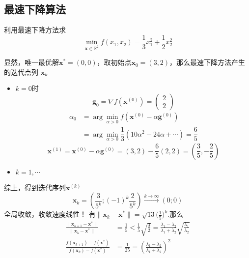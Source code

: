 \subsection{最速下降算法}
\begin{example}
    利用最速下降方法求
    \[
        \min\limits_{\boldsymbol{x}\in\mathbb{R}^2}f(x_1,x_2) = \dfrac{1}{3}x_{1}^2+\dfrac{1}{2}x_2^2
    \]
    \begin{solution}
        显然，唯一最优解$\boldsymbol{x}^* = \left( 0,0 \right)$，取初始点$\boldsymbol{x}_0 = (3,2)$，那么最速下降方法产生的迭代点列
        $\boldsymbol{x}_k$

        \begin{itemize}
            \item $k = 0$时
            \[
                \boldsymbol{g}_0 = \nabla f(\boldsymbol{x}^{(0)})  =  \begin{pmatrix}
                    2\\2
                \end{pmatrix}
            \]
            \[
                \begin{aligned}
                    \alpha_0 &= \arg\min_{\alpha>0}f(\boldsymbol{x}^{(0)}-\alpha\boldsymbol{g}^{(0)})\\
                    &=\arg\min_{\alpha>0}\dfrac{1}{3}\left( 10\alpha^2-24\alpha+\cdots \right) = \dfrac{6}{5}
                \end{aligned}
            \]
            \[
                \boldsymbol{x}^{(1)} = \boldsymbol{x}^{(0)}-\alpha\boldsymbol{g}^{(0)  } = (3,2)-\dfrac{6}{5}(2,2)  = (\dfrac{3}{5},-\dfrac{2}{5})
            \]
            \item $k = 1,\cdots $
        \end{itemize}
        综上，得到迭代序列$\boldsymbol{x}^{(k)}$
        \[
            \boldsymbol{x}_{k}=\left(\frac{3}{5^{k}};(-1)^{k}\frac{2}{5^{k}}\right)\overset{k\to\infty}{\longrightarrow}(0;0)
        \]
        全局收敛，收敛速度线性！
        有$\|\boldsymbol{x}_k-\boldsymbol{x}^*\|=\sqrt{13}\big(\frac15\big)^k.$那么
        \[
            \begin{aligned}
                \frac{\|\boldsymbol{x}_{k+1}-\boldsymbol{x}^*\|}{\|\boldsymbol{x}_k-\boldsymbol{x}^*\|} & =\frac15<\frac15\sqrt{\frac32}=\frac{\lambda_1-\lambda_2}{\lambda_1+\lambda_2}\sqrt{\frac{\lambda_1}{\lambda_2}}\\
                \frac{f(\boldsymbol{x}_{k+1})-f(\boldsymbol{x}^*)}{f(\boldsymbol{x}_k)-f(\boldsymbol{x}^*)} & =\frac1{25}=\left(\frac{\lambda_1-\lambda_2}{\lambda_1+\lambda_2}\right)^2
            \end{aligned}
        \]
    \end{solution}
\end{example}
